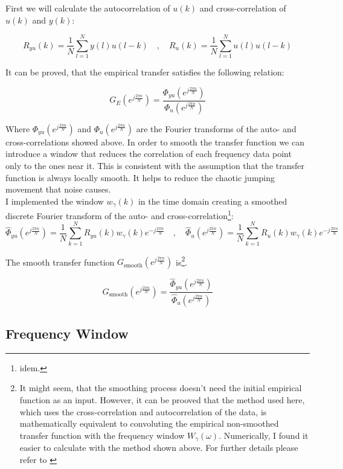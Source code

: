 First we will calculate the autocorrelation of $u(k)$ and cross-correlation of $u(k)$ and $y(k)$:

\[R_{yu}(k) = \frac{1}{N}\sum\limits_{l = 1}^N y(l)u(l-k) \quad , \quad R_{u}(k) = \frac{1}{N}\sum\limits_{l = 1}^N u(l)u(l-k)\]

It can be proved, that the empirical transfer satisfies the following relation: 

\[G_E(e^{j\frac{2\pi n}{N}}) = \frac{\Phi_{yu}(e^{j\frac{2\pi n}{N}})}{\Phi_{u}(e^{j\frac{2\pi n}{N}})}\]

Where $\Phi_{yu}(e^{j\frac{2\pi n}{N}})$ and $\Phi_{u}(e^{j\frac{2\pi n}{N}})$ are the Fourier transforms of the auto- and cross-correlations showed above. In order to smooth the transfer function we can introduce a window that reduces the correlation of each frequency data point only to the ones near it. This is consistent with the assumption that the transfer function is always locally smooth. It helps to reduce the chaotic jumping movement that noise causes. \\

I implemented the window $w_\gamma(k)$ in the time domain creating a smoothed discrete Fourier transform of the auto- and cross-correlation\footnote[3]{idem.}:
\[\hat{\Phi}_{yu}(e^{j\frac{2\pi n}{N}}) = \frac{1}{N}\sum\limits_{k = 1}^{N }R_{yu}(k)w_\gamma(k)e^{-j\frac{2\pi n}{N}} \quad, \quad \hat{\Phi}_{u}(e^{j\frac{2\pi n}{N}}) = \frac{1}{N}\sum\limits_{k = 1}^{N }R_{u}(k)w_\gamma(k)e^{-j\frac{2\pi n}{N}}\]

The smooth transfer function $G_\text{smooth}(e^{j\frac{2\pi n}{N}})$ is\footnote[4]{It might seem, that the smoothing process doesn't need the initial empirical function as an input. However, it can be prooved that the method used here, which uses the cross-correlation and autocorrelation of the data, is mathematically equivalent to convoluting the empirical non-smoothed transfer function with the frequency window $W_\gamma(\omega)$. Numerically, I found it easier to calculate with the method shown above. For further details please refer to \cite{ljung1999system}}.


\[G_\text{smooth}(e^{j\frac{2\pi n}{N}}) = \frac{\hat{\Phi}_{yu}(e^{j\frac{2\pi n}{N}})}{\hat{\Phi}_{u}(e^{j\frac{2\pi n}{N}})}\]


\subsection{Frequency Window}

